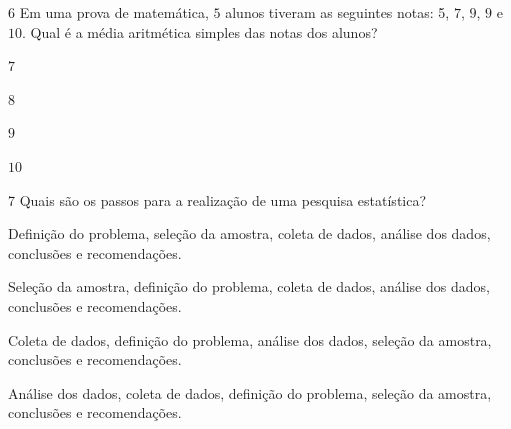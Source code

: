 
\num{6}  Em uma prova de matemática, $5$ alunos tiveram as seguintes notas: 5, $7$, $9$, $9$ e $10$. Qual é a média aritmética simples das notas dos alunos?

\begin{escolha}
\item $7$
\item $8$
\item $9$
\item $10$
\end{escolha}



\num{7}  Quais são os passos para a realização de uma pesquisa estatística?

\begin{escolha}
\item Definição do problema, seleção da amostra, coleta de dados, análise
dos dados, conclusões e recomendações.
\item Seleção da amostra, definição do problema, coleta de dados, análise
dos dados, conclusões e recomendações.
\item Coleta de dados, definição do problema, análise dos dados, seleção da
amostra, conclusões e recomendações.
\item Análise dos dados, coleta de dados, definição do problema, seleção da
amostra, conclusões e recomendações.
\end{escolha}

